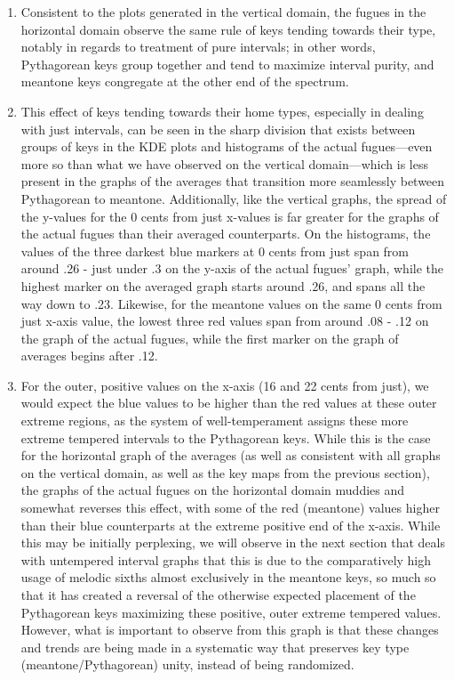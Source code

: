 \begin{enumerate}
\def\labelenumi{\arabic{enumi}.}
\tightlist
\item
  Consistent to the plots generated in the vertical domain, the fugues
  in the horizontal domain observe the same rule of keys tending towards
  their type, notably in regards to treatment of pure intervals; in
  other words, Pythagorean keys group together and tend to maximize
  interval purity, and meantone keys congregate at the other end of the
  spectrum.
\item
  This effect of keys tending towards their home types, especially in
  dealing with just intervals, can be seen in the sharp division that
  exists between groups of keys in the KDE plots and histograms of the
  actual fugues---even more so than what we have observed on the
  vertical domain---which is less present in the graphs of the
  averages that transition more seamlessly between Pythagorean to
  meantone. Additionally, like the vertical graphs, the spread of the
  y-values for the 0 cents from just x-values is far greater for the
  graphs of the actual fugues than their averaged counterparts. On the
  histograms, the values of the three darkest blue markers at 0 cents
  from just span from around .26 - just under .3 on the y-axis of the
  actual fugues' graph, while the highest marker on the averaged graph
  starts around .26, and spans all the way down to .23. Likewise, for
  the meantone values on the same 0 cents from just x-axis value, the
  lowest three red values span from around .08 - .12 on the graph of the
  actual fugues, while the first marker on the graph of averages begins
  after .12.
\item
  For the outer, positive values on the x-axis (16 and 22 cents from
  just), we would expect the blue values to be higher than the red
  values at these outer extreme regions, as the system of
  well-temperament assigns these more extreme tempered intervals to the
  Pythagorean keys. While this is the case for the horizontal graph of
  the averages (as well as consistent with all graphs on the vertical
  domain, as well as the key maps from the previous section), the graphs
  of the actual fugues on the horizontal domain muddies and somewhat
  reverses this effect, with some of the red (meantone) values higher
  than their blue counterparts at the extreme positive end of the
  x-axis. While this may be initially perplexing, we will observe in the
  next section that deals with untempered interval graphs that this is
  due to the comparatively high usage of melodic sixths almost
  exclusively in the meantone keys, so much so that it has created a
  reversal of the otherwise expected placement of the Pythagorean keys
  maximizing these positive, outer extreme tempered values. However,
  what is important to observe from this graph is that these changes and
  trends are being made in a systematic way that preserves key type
  (meantone/Pythagorean) unity, instead of being randomized.
\end{enumerate}

